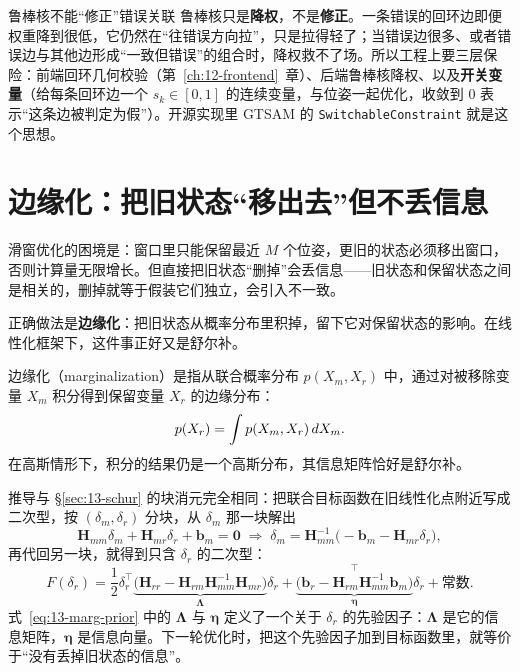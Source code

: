 \begin{keybox}{鲁棒核不能``修正''错误关联}
鲁棒核只是\textbf{降权}，不是\textbf{修正}。一条错误的回环边即便权重降到很低，它仍然在``往错误方向拉''，只是拉得轻了；当错误边很多、或者错误边与其他边形成``一致但错误''的组合时，降权救不了场。所以工程上要三层保险：前端回环几何校验（第~\ref{ch:12-frontend}~章）、后端鲁棒核降权、以及\textbf{开关变量}（给每条回环边一个 $s_k\in[0,1]$ 的连续变量，与位姿一起优化，收敛到 0 表示``这条边被判定为假''）。开源实现里 GTSAM 的 \lstinline{SwitchableConstraint} 就是这个思想\cite{dellaert2017factorgraphs}。
\end{keybox}

\section{边缘化：把旧状态``移出去''但不丢信息}\label{sec:13-marginalization}

滑窗优化的困境是：窗口里只能保留最近 $M$ 个位姿，更旧的状态必须移出窗口，否则计算量无限增长。但直接把旧状态``删掉''会丢信息——旧状态和保留状态之间是相关的，删掉就等于假装它们独立，会引入不一致。

正确做法是\textbf{边缘化}：把旧状态从概率分布里积掉，留下它对保留状态的影响。在线性化框架下，这件事正好又是舒尔补。

\begin{definition}[边缘化]
边缘化（marginalization）是指从联合概率分布 $p(X_m,X_r)$ 中，通过对被移除变量 $X_m$ 积分得到保留变量 $X_r$ 的边缘分布：
\begin{equation}
p(X_r)=\int p(X_m,X_r)\,d X_m .
\end{equation}
在高斯情形下，积分的结果仍是一个高斯分布，其信息矩阵恰好是舒尔补。
\end{definition}

推导与 \S\ref{sec:13-schur} 的块消元完全相同：把联合目标函数在旧线性化点附近写成二次型，按 $(\delta_m,\delta_r)$ 分块，从 $\delta_m$ 那一块解出
\begin{equation}
\bm{H}_{mm}\delta_m+\bm{H}_{mr}\delta_r+\bm{b}_m=\bm{0}
\;\Longrightarrow\;
\delta_m=\bm{H}_{mm}^{-1}\big(-\bm{b}_m-\bm{H}_{mr}\delta_r\big),
\end{equation}
再代回另一块，就得到只含 $\delta_r$ 的二次型：
\begin{equation}
F(\delta_r)=\frac12\delta_r^{\top}\underbrace{\Big(\bm{H}_{rr}-\bm{H}_{rm}\bm{H}_{mm}^{-1}\bm{H}_{mr}\Big)}_{\bm{\Lambda}}\delta_r
+\underbrace{\Big(\bm{b}_r-\bm{H}_{rm}\bm{H}_{mm}^{-1}\bm{b}_m\Big)}_{\bm{\eta}}^{\top}\delta_r+\text{常数}.
\label{eq:13-marg-prior}
\end{equation}
式~\eqref{eq:13-marg-prior} 中的 $\bm{\Lambda}$ 与 $\bm{\eta}$ 定义了一个关于 $\delta_r$ 的先验因子：$\bm{\Lambda}$ 是它的信息矩阵，$\bm{\eta}$ 是信息向量。下一轮优化时，把这个先验因子加到目标函数里，就等价于``没有丢掉旧状态的信息''。

